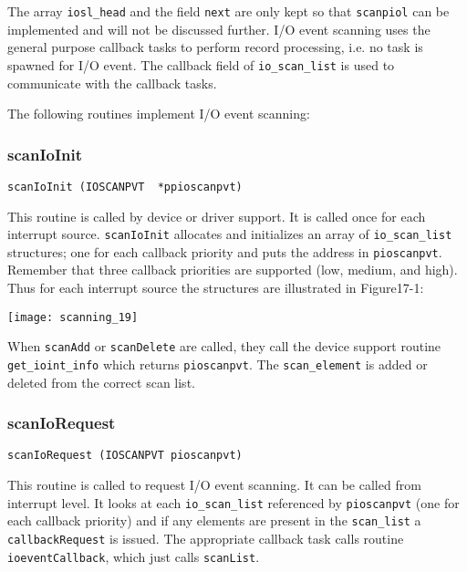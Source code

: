 The array \verb|iosl_head| and the field \verb|next| are only kept so that \verb|scanpiol| can be implemented and will not be discussed 
further. I/O event scanning uses the general purpose callback tasks to perform record processing, i.e. no task is spawned 
for I/O event. The callback field of \verb|io_scan_list| is used to communicate with the callback tasks.

The following routines implement I/O event scanning:

\subsubsection{scanIoInit}

\begin{verbatim}
scanIoInit (IOSCANPVT  *ppioscanpvt)
\end{verbatim}

This routine is called by device or driver support. It is called once for each interrupt source. \verb|scanIoInit| allocates and 
initializes an array of \verb|io_scan_list| structures; one for each callback priority and puts the address in \verb|pioscanpvt|. 
Remember that three callback priorities are supported (low, medium, and high). Thus for each interrupt source the 
structures are illustrated in Figure17-1:

\begin{center}
\texttt{[image: scanning\_19]}
\end{center}

When \verb|scanAdd| or \verb|scanDelete| are called, they call the device support routine \verb|get_ioint_info| which returns 
\verb|pioscanpvt|. The \verb|scan_element| is added or deleted from the correct scan list. 

\subsubsection{scanIoRequest}

\begin{verbatim}
scanIoRequest (IOSCANPVT pioscanpvt)
\end{verbatim}

This routine is called to request I/O event scanning. It can be called from interrupt level. It looks at each \verb|io_scan_list| 
referenced by \verb|pioscanpvt| (one for each callback priority) and if any elements are present in the \verb|scan_list| a 
\verb|callbackRequest| is issued. The appropriate callback task calls routine \verb|ioeventCallback|, which just calls 
\verb|scanList|. 

